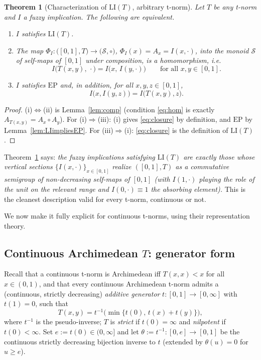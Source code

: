 \documentclass{amsart}
\newtheorem{theorem}{Theorem}
\theoremstyle{definition}
\theoremstyle{remark}
\newcommand{\zo}{[0,1]}
\newcommand{\LI}{\mathrm{LI}}
\newcommand{\EP}{\mathrm{EP}}
\newcommand{\Ax}{A}
\begin{document}
\begin{theorem}[Characterization of $\LI(T)$, arbitrary t-norm]\label{thm:a-general}
Let $T$ be any t-norm and $I$ a fuzzy implication. The following are equivalent.
\begin{enumerate}
\item[(i)] $I$ satisfies $\LI(T)$.
\item[(ii)] The map $\Phi_I\colon\bigl(\zo,T\bigr)\to\bigl(\mathcal{S},\circ\bigr)$,
$\Phi_I(x)=\Ax_x=I(x,\cdot)$, into the monoid $\mathcal{S}$ of self-maps of $\zo$ under
composition, is a homomorphism, i.e.
\begin{equation}\label{eq:hom}
I\bigl(T(x,y),\,\cdot\bigr)=I\bigl(x,\,I(y,\cdot)\bigr)\qquad\text{for all }x,y\in\zo .
\end{equation}
\item[(iii)] $I$ satisfies $\EP$ and, in addition, for all $x,y,z\in\zo$,
\begin{equation}\label{eq:closure}
I\bigl(x,I(y,z)\bigr)=I\bigl(T(x,y),z\bigr).
\end{equation}
\end{enumerate}
\end{theorem}

\begin{proof}
(i)$\Leftrightarrow$(ii) is Lemma~\ref{lem:comp} (condition \eqref{eq:hom} is exactly
$\Ax_{T(x,y)}=\Ax_x\circ \Ax_y$). For (i)$\Rightarrow$(iii): (i) gives \eqref{eq:closure}
by definition, and $\EP$ by Lemma~\ref{lem:LIimpliesEP}. For (iii)$\Rightarrow$(i):
\eqref{eq:closure} is the definition of $\LI(T)$.
\end{proof}

Theorem~\ref{thm:a-general} says: \emph{the fuzzy implications satisfying $\LI(T)$ are
exactly those whose vertical sections $\{I(x,\cdot)\}_{x\in\zo}$ realize $([0,1],T)$ as a
commutative semigroup of non-decreasing self-maps of $\zo$ (with $I(1,\cdot)$ playing the
role of the unit on the relevant range and $I(0,\cdot)\equiv1$ the absorbing element).}
This is the cleanest description valid for every t-norm, continuous or not.

We now make it fully explicit for continuous t-norms, using their representation theory.

\subsection{Continuous Archimedean $T$: generator form}

Recall that a continuous t-norm is Archimedean iff $T(x,x)<x$ for all $x\in(0,1)$, and
that every continuous Archimedean t-norm admits a (continuous, strictly decreasing)
\emph{additive generator} $t\colon\zo\to[0,\infty]$ with $t(1)=0$, such that
\begin{equation}\label{eq:gen}
T(x,y)=t^{-1}\!\bigl(\min\{t(0),\,t(x)+t(y)\}\bigr),
\end{equation}
where $t^{-1}$ is the pseudo-inverse; $T$ is \emph{strict} if $t(0)=\infty$ and
\emph{nilpotent} if $t(0)<\infty$. Set $e:=t(0)\in(0,\infty]$ and let
$\theta:=t^{-1}\colon[0,e]\to\zo$ be the continuous strictly decreasing bijection inverse to
$t$ (extended by $\theta(u)=0$ for $u\ge e$).
\end{document}
